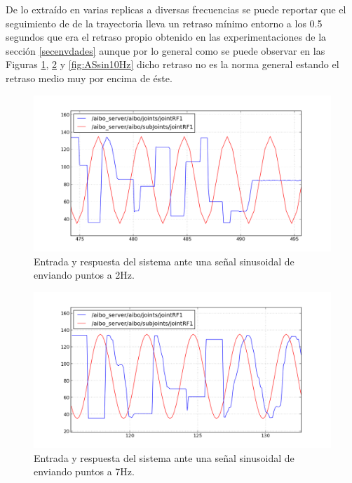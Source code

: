 \documentclass[12pt,a4paper,final,twoside]{book}
\begin{document}
De lo extraído en varias replicas a diversas frecuencias se puede reportar que el seguimiento de de la trayectoria lleva un retraso mínimo entorno a los 0.5 segundos que era el retraso propio obtenido en las experimentaciones de la sección \ref{secenvdades} aunque por lo general como se puede observar en las Figuras \ref{fig:ASsin2Hz}, \ref{fig:ASsin7Hz} y \ref{fig:ASsin10Hz} 
dicho retraso no es la norma general estando el retraso medio muy por encima de éste.
\begin{figure}[H]
	\centering
    \includegraphics[scale=0.66]{images/sinlegWR/10Ry2S.png}
 	\caption{Entrada y respuesta del sistema ante una señal sinusoidal de enviando puntos a 2Hz.}
  \label{fig:ASsin2Hz}
\end{figure}
\begin{figure}[H]
	\centering
    \includegraphics[scale=0.66]{images/sinlegWR/10Ry7S.png}
 	\caption{Entrada y respuesta del sistema ante una señal sinusoidal de enviando puntos a 7Hz.}
  \label{fig:ASsin7Hz}
\end{figure}
\end{document}
